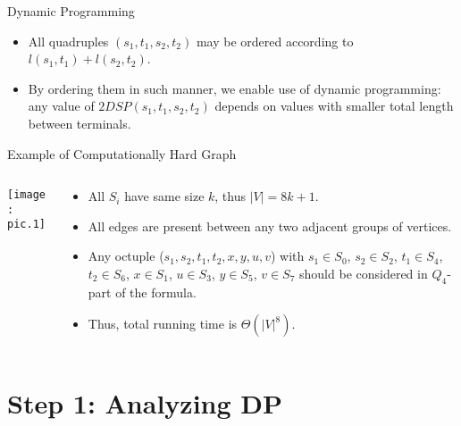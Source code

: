 \documentclass{beamer}
\begin{document}
\begin{frame}{Dynamic Programming}
    \begin{itemize}
        \item All quadruples $(s_1, t_1, s_2, t_2)$ may be ordered according to $l(s_1, t_1) + l(s_2, t_2)$.
        \item By ordering them in such manner, we enable use of dynamic programming: any value of $2DSP(s_1, t_1, s_2, t_2)$ depends on values with smaller total length between terminals.
    \end{itemize}
\end{frame}

\begin{frame}{Example of Computationally Hard Graph}
    \begin{columns}
    \begin{column}{0.4\linewidth}
    \texttt{[image: pic.1]}
    \end{column}
    \begin{column}{0.6\linewidth}
    \begin{itemize}
        \item All $S_i$ have same size $k$, thus $|V| = 8k+1$.
        \item All edges are present between any two adjacent groups of vertices.
        \item Any octuple ($s_1, s_2, t_1, t_2, x, y, u, v$) with
        $s_1 \in S_0$, $s_2 \in S_2$, $t_1 \in S_4$, $t_2 \in S_6$, $x \in S_1$, $u \in S_3$, $y \in S_5$, $v \in S_7$ should be considered in $Q_4$-part of the formula.
        \item Thus, total running time is $\Theta(|V|^8)$.
    \end{itemize}
    \end{column}
    \end{columns}
\end{frame}

\section{Step 1: Analyzing DP}
\end{document}
